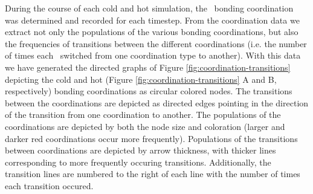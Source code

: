 During the course of each cold and hot simulation, the \suldiox~bonding coordination was determined and recorded for each timestep. From the coordination data we extract not only the populations of the various bonding coordinations, but also the frequencies of transitions between the different coordinations (i.e. the number of times each \suldiox~switched from one coordination type to another). With this data we have generated the directed graphs of Figure \ref{fig:coordination-transitions} depicting the cold and hot (Figure \ref{fig:coordination-transitions} A and B, respectively) bonding coordinations as circular colored nodes.\cite{Ellson2004,Gansner1999} The transitions between the coordinations are depicted as directed edges pointing in the direction of the transition from one coordination to another. The populations of the coordinations are depicted by both the node size and coloration (larger and darker red coordinations occur more frequently). Populations of the transitions between coordinations are depicted by arrow thickness, with thicker lines corresponding to more frequently occuring transitions. Additionally, the transition lines are numbered to the right of each line with the number of times each transition occured. 

